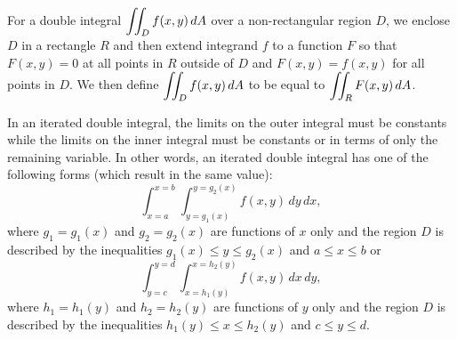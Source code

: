 






\begin{summary}
\item For a double integral $\displaystyle \iint_D f(x,y) \, dA$ over a non-rectangular region $D$, we enclose $D$ in a rectangle $R$ and then extend integrand $f$ to a function $F$ so that $F(x,y) = 0$ at all points in $R$ outside of $D$ and $F(x,y) = f(x,y)$ for all points in $D$. We then define $\displaystyle \iint_D f(x,y) \, dA$ to be equal to $\displaystyle \iint_R F(x,y) \, dA$.
\item In an iterated double integral, the limits on the outer integral must be constants while the limits on the inner integral must be constants or in terms of only the remaining variable. In other words, an iterated double integral has one of the following forms (which result in the same value):
\[\int_{x=a}^{x=b} \int_{y=g_1(x)}^{y=g_2(x)} f(x,y) \, dy \, dx,\]
where $g_1=g_1(x)$ and $g_2=g_2(x)$ are functions of $x$ only and the region $D$ is described by the inequalities $g_1(x) \leq y \leq g_2(x)$ and $a \leq x \leq b$ or
\[\int_{y=c}^{y=d} \int_{x=h_1(y)}^{x=h_2(y)} f(x,y) \, dx \, dy,\]
where $h_1=h_1(y)$ and $h_2=h_2(y)$ are functions of $y$ only and the region $D$ is described by the inequalities $h_1(y) \leq x \leq h_2(y)$ and $c \leq y \leq d$.
\end{summary}



\nin \hrulefill



\clearpage
